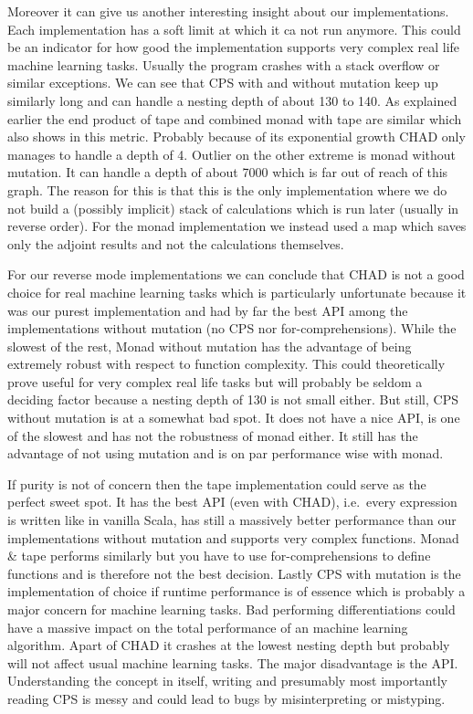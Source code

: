 Moreover it can give us another interesting insight about our implementations. Each implementation has a soft limit at which it ca not run anymore. This could be an indicator for how good the implementation supports very complex real life machine learning tasks.  Usually the program crashes with a stack overflow or similar exceptions. We can see that CPS with and without mutation keep up similarly long and can handle a nesting depth of about 130 to 140. As explained earlier the end product of tape and combined monad with tape are similar which also shows in this metric. Probably because of its exponential growth CHAD only manages to handle a depth of 4. Outlier on the other extreme is monad without mutation. It can handle a depth of about 7000 which is far out of reach of this graph. The reason for this is that this is the only implementation where we do not build a (possibly implicit) stack of calculations which is run later (usually in reverse order). For the monad implementation we instead used a map which saves only the adjoint results and not the calculations themselves.

For our reverse mode implementations we can conclude that CHAD is not a good choice for real machine learning tasks which is particularly unfortunate because it was our purest implementation and had by far the best API among the implementations without mutation (no CPS nor for-comprehensions). While the slowest of the rest, Monad without mutation has the advantage of being extremely robust with respect to function complexity. This could theoretically prove useful for very complex real life tasks but will probably be seldom a deciding factor because a nesting depth of 130 is not small either. But still, CPS without mutation is at a somewhat bad spot. It does not have a nice API, is one of the slowest and has not the robustness of monad either. It still has the advantage of not using mutation and is on par performance wise with monad.

If purity is not of concern then the tape implementation could serve as the perfect sweet spot. It has the best API (even with CHAD), i.e.\ every expression is written like in vanilla Scala, has still a massively better performance than our implementations without mutation and supports very complex functions. Monad \& tape performs similarly but you have to use for-comprehensions to define functions and is therefore not the best decision. Lastly CPS with mutation is the implementation of choice if runtime performance is of essence which is probably a major concern for machine learning tasks. Bad performing differentiations could have a massive impact on the total performance of an machine learning algorithm. Apart of CHAD it crashes at the lowest nesting depth but probably will not affect usual machine learning tasks. The major disadvantage is the API. Understanding the concept in itself, writing and presumably most importantly reading CPS is messy and could lead to bugs by misinterpreting or mistyping.

